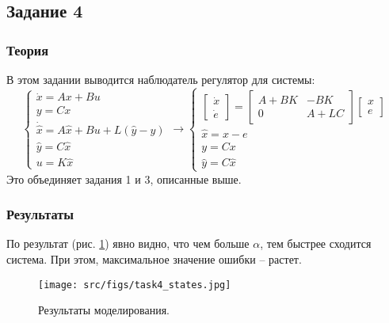 \subsection{Задание 4}

\subsubsection{Теория}
В этом задании выводится наблюдатель регулятор для системы:
\[
        \begin{cases}
                \dot{x} = A x + B u\\
                y = C x \\
                \dot{\hat{x}} = A \hat{x} + B u + L(\hat{y} - y) \\
                \hat{y} = C \hat{x} \\
                u = K \hat{x}
        \end{cases} \rightarrow
        \begin{cases}
            \begin{bmatrix} 
                \dot{x} \\
                \dot{e}
            \end{bmatrix} = 
            \begin{bmatrix} 
                A + BK & -BK\\
                0 & A + LC
            \end{bmatrix}
            \begin{bmatrix} 
              x \\
              e
          \end{bmatrix} 
            \\
            \hat{x} = x - e \\
            y = Cx \\
            \hat{y} = C \hat{x}
         \end{cases}
\]
Это объединяет задания 1 и 3, описанные выше.

\subsubsection{Результаты}
По результат (рис. \ref{fig:task4}) явно видно, что чем больше \(\alpha\), тем быстрее сходится система. При этом, максимальное значение ошибки -- растет.

\begin{figure}[ht!]
    \centering
    \texttt{[image: src/figs/task4\_states.jpg]}
    \caption{Результаты моделирования.}
    \label{fig:task4}
\end{figure}




\FloatBarrier

